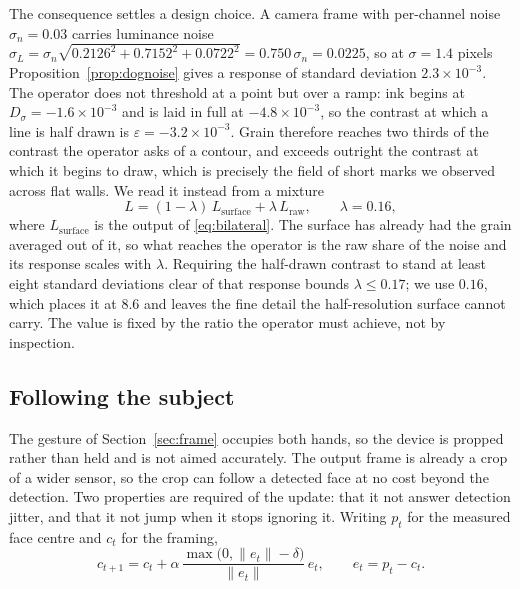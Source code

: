 \documentclass{article}
\theoremstyle{definition}
\begin{document}
The consequence settles a design choice. A camera frame with per-channel noise
$\sigma_n = 0.03$ carries luminance noise
$\sigma_L = \sigma_n\sqrt{0.2126^2+0.7152^2+0.0722^2} = 0.750\,\sigma_n = 0.0225$,
so at $\sigma = 1.4$ pixels Proposition~\ref{prop:dognoise} gives a response of
standard deviation $2.3\times10^{-3}$. The operator does not threshold at a point
but over a ramp: ink begins at $D_\sigma = -1.6\times10^{-3}$ and is laid in full
at $-4.8\times10^{-3}$, so the contrast at which a line is half drawn is
$\varepsilon = -3.2\times10^{-3}$. Grain therefore reaches two thirds of the
contrast the operator asks of a contour, and exceeds outright the contrast at
which it begins to draw, which is precisely the field of short marks we observed
across flat walls. We read it instead from
a mixture
\begin{equation}
  \label{eq:mixture}
  L = (1-\lambda)\,L_{\text{surface}} + \lambda\,L_{\text{raw}}, \qquad \lambda = 0.16,
\end{equation}
where $L_{\text{surface}}$ is the output of \eqref{eq:bilateral}. The surface
has already had the grain averaged out of it, so what reaches the operator is the
raw share of the noise and its response scales with $\lambda$. Requiring the
half-drawn contrast to stand at least eight standard deviations clear of that
response bounds $\lambda \leq 0.17$; we use $0.16$, which places it at $8.6$ and
leaves the fine detail the half-resolution surface cannot carry. The value is
fixed by the ratio the operator must achieve, not by inspection.

\subsection{Following the subject}
\label{sec:framing}

The gesture of Section~\ref{sec:frame} occupies both hands, so the device is
propped rather than held and is not aimed accurately. The output frame is
already a crop of a wider sensor, so the crop can follow a detected face
\citep{bazarevsky2019blazeface} at no cost beyond the detection. Two properties
are required of the update: that it not answer detection jitter, and that it not
jump when it stops ignoring it. Writing $p_t$ for the measured face centre and
$c_t$ for the framing,
\begin{equation}
  \label{eq:deadzone}
  c_{t+1} = c_t + \alpha\,\frac{\max\big(0, \|e_t\| - \delta\big)}{\|e_t\|}\,e_t,
  \qquad e_t = p_t - c_t .
\end{equation}
\end{document}
